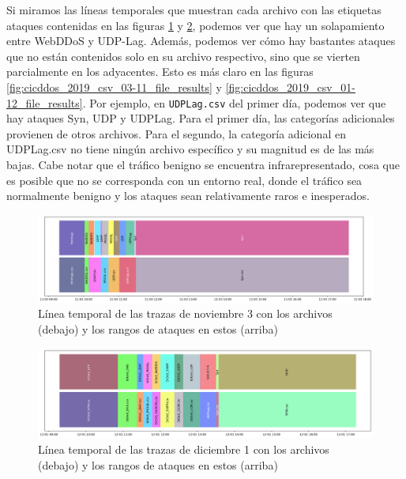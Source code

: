Si miramos las líneas temporales que muestran cada archivo con las etiquetas ataques contenidas en las figuras \ref{fig:cicddos_2019_csv_03-11_timeline} y \ref{fig:cicddos_2019_csv_01-12_timeline}, podemos ver que hay un solapamiento entre WebDDoS y UDP-Lag. Además, podemos ver cómo hay bastantes ataques que no están contenidos solo en su archivo respectivo, sino que se vierten parcialmente en los adyacentes. Esto es más claro en las figuras \ref{fig:cicddos_2019_csv_03-11_file_results} y \ref{fig:cicddos_2019_csv_01-12_file_results}. Por ejemplo, en \texttt{UDPLag.csv} del primer día, podemos ver que hay ataques Syn, UDP y UDPLag. Para el primer día, las categorías adicionales provienen de otros archivos. Para el segundo, la categoría adicional en UDPLag.csv no tiene ningún archivo específico y su magnitud es de las más bajas. Cabe notar que el tráfico benigno se encuentra infrarepresentado, cosa que es posible que no se corresponda con un entorno real, donde el tráfico sea normalmente benigno y los ataques sean relativamente raros e inesperados.

\begin{figure}[H]
  \begin{center}
      \includegraphics[width=0.7\linewidth]{media/cicddos_2019_csv_03-11_timeline.png}
  \end{center}
  \captionsetup{justification=centering}
  \caption{Línea temporal de las trazas de noviembre 3 con los archivos (debajo) y los rangos de ataques en estos (arriba)}\label{fig:cicddos_2019_csv_03-11_timeline}
\end{figure}

\begin{figure}[!htb]
  \begin{center}
      \includegraphics[width=1\linewidth]{media/cicddos_2019_csv_01-12_timeline.png}
  \end{center}
  \captionsetup{justification=centering}
  \caption{Línea temporal de las trazas de diciembre 1 con los archivos (debajo) y los rangos de ataques en estos (arriba)}\label{fig:cicddos_2019_csv_01-12_timeline}
\end{figure}

